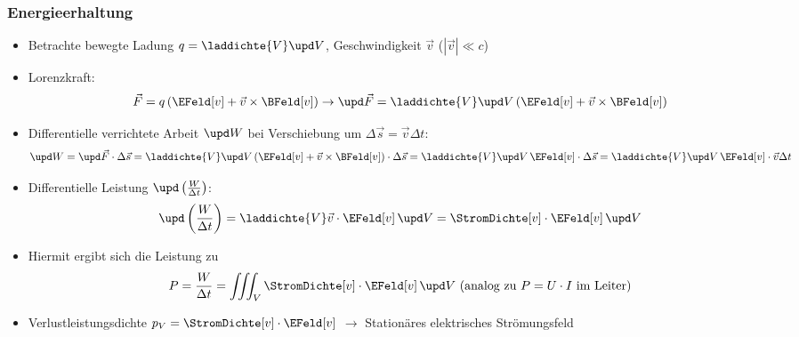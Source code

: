 \begin{frame}
  \frametitle{Energieerhaltung}
  \begin{itemize}[<+->]
  \item Betrachte bewegte Ladung $q = \laddichte{V}\upd V$, Geschwindigkeit $\vec{v}$ ($|\vec{v}| \ll c$)
  \item Lorenzkraft:
    $$
    \vec{F} = q \left( \EFeld[v] + \vec{v} \times \BFeld[v]\right) \to \upd\vec{F} = \laddichte{V}\upd V \left( \EFeld[v] + \vec{v} \times \BFeld[v]\right) 
    $$
  \item Differentielle \alert{verrichtete Arbeit} $\upd W$ bei Verschiebung um $\Delta\vec{s} = \vec{v} \Delta t$:
    $$
      \upd W =  \upd\vec{F} \cdot \Delta\vec{s} = \laddichte{V}\upd V \left( \EFeld[v] + \vec{v} \times \BFeld[v]\right)\cdot \Delta\vec{s}
      = \laddichte{V}\upd V\, \EFeld[v] \cdot \Delta\vec{s} = \laddichte{V}\upd V\, \EFeld[v] \cdot \vec{v} \Delta t
    $$
  \item Differentielle \alert{Leistung} $\upd\left( \frac{W}{\Delta t}\right)$:
    $$
    \upd\left( \frac{W}{\Delta t}\right) = \laddichte{V}\vec{v}\cdot\EFeld[v]\, \upd V = \StromDichte[v]\cdot\EFeld[v]\, \upd V
    $$
  \item Hiermit ergibt sich die \alert{Leistung} zu
    $$
    P = \frac{W}{\Delta t} = \iiint_V \StromDichte[v]\cdot\EFeld[v]\, \upd V \text{ (analog zu } P=U\cdot I \text{ im Leiter)}
    $$
    \item \alert{Verlustleistungsdichte} $p_V=\StromDichte[v]\cdot\EFeld[v]$ $\to$ Stationäres elektrisches Strömungsfeld
  \end{itemize}
\end{frame}

